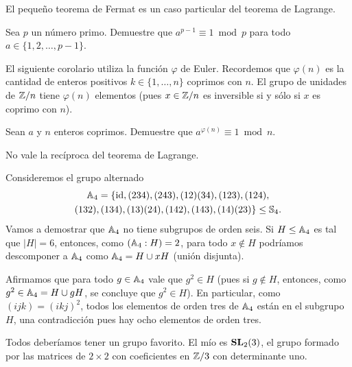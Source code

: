 
El pequeño teorema de Fermat es un caso particular del teorema de Lagrange.

\begin{exercise}
	Sea $p$ un número primo. Demuestre que 
	$a^{p-1}\equiv1\bmod p$  
	para todo $a\in\{1,2,\dots,p-1\}$. 
\end{exercise}

El siguiente corolario utiliza la función $\varphi$ de Euler. Recordemos que
$\varphi(n)$ es la cantidad de enteros positivos $k\in\{1,\dots,n\}$ 
coprimos con $n$. El grupo de
unidades de $\mathbb{Z}/n$ tiene $\varphi(n)$ elementos (pues $x\in\mathbb{Z}/n$ es inversible
si y sólo si $x$ es coprimo con $n$). 

\begin{exercise}
	Sean $a$ y $n$ enteros coprimos. Demuestre que 
	$a^{\varphi(n)}\equiv1\bmod n$.
\end{exercise}

No vale la recíproca del teorema de Lagrange.

\begin{example}
Consideremos el grupo alternado 
\begin{multline*}
\mathbb{A}_4=\{\operatorname{id},(234),(243),(12)(34),(123),(124),\\(132),(134),(13)(24),(142),(143),(14)(23)\}\leq\mathbb{S}_4.	
\end{multline*}
Vamos a demostrar que $\mathbb{A}_4$ no tiene subgrupos de orden seis. Si $H\leq\mathbb{A}_4$ es tal que 
$|H|=6$, entonces, como $(\mathbb{A}_4:H)=2$, para todo $x\not\in H$ podríamos descomponer a $\mathbb{A}_4$ como $\mathbb{A}_4=H\cup xH$ (unión disjunta). 

Afirmamos que
para todo $g\in\mathbb{A}_4$ vale que $g^2\in H$ (pues si $g\not\in H$, entonces, como $g^2\in\mathbb{A}_4=H\cup gH$, se concluye que $g^2\in H$). En particular, como
$(ijk)=(ikj)^2$, 
todos los elementos de orden tres de $\mathbb{A}_4$ están en el subgrupo $H$, una contradicción pues hay ocho elementos de orden tres.   
\end{example}

Todos deberíamos tener un grupo favorito. El mío es $\mathbf{SL}_2(3)$,
el grupo formado por las matrices de $2\times2$ con coeficientes en $\mathbb{Z}/3$ 
con determinante uno.


